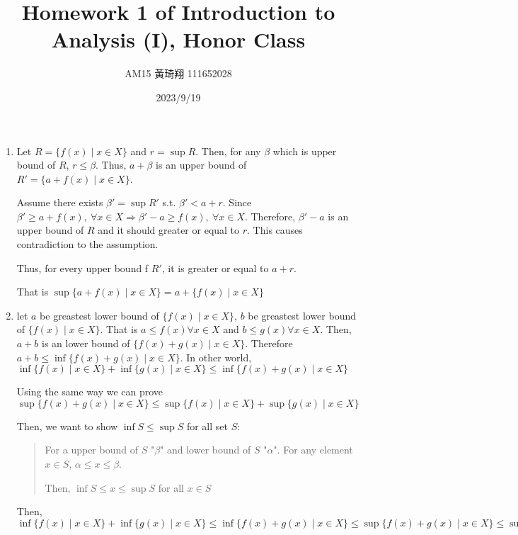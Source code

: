 \documentclass[12pt]{article}
\title{Homework 1 of Introduction to Analysis (I), Honor Class}
\author{AM15 黃琦翔 111652028}
\date{2023/9/19}
\begin{document}
\maketitle
\begin{enumerate}
    \item Let $R = \lbrace f(x) \mid x \in X \rbrace$ and $r = \sup R$. 
    Then, for any $\beta$ which is upper bound of $R$, $r \leq \beta$. 
    Thus, $a + \beta$ is an upper bound of $R' = \lbrace a + f(x) \mid x \in X \rbrace$.

    Assume there exists $\beta' = \sup R'$ s.t. $\beta' < a+r$. 
    Since $\beta' \geq a + f(x),\ \forall x \in X \Rightarrow \beta' - a \geq f(x),\ \forall x \in X$. 
    Therefore, $\beta' - a$ is an upper bound of $R$ and it should greater or equal to $r$. 
    This causes contradiction to the assumption.

    Thus, for every upper bound f $R'$, it is greater or equal to $a + r$.
    
    That is $\sup\lbrace a + f(x) \mid x \in X \rbrace = a + \lbrace f(x) \mid x \in X \rbrace$

    \item let $a$ be greastest lower bound of $\lbrace f(x) \mid x \in X\rbrace$, $b$ be greastest lower bound of $\lbrace f(x) \mid x \in X\rbrace$.
    That is $a \leq f(x) \forall x \in X$ and $b \leq g(x) \forall x \in X$.
    Then, $a + b$ is an lower bound of $\lbrace f(x) + g(x) \mid x \in X \rbrace$. Therefore $a + b \leq \inf \lbrace f(x) + g(x) \mid x \in X\rbrace$.
    In other world, $\inf \lbrace f(x) \mid x \in X\rbrace + \inf \lbrace g(x) \mid x \in X\rbrace \leq \inf \lbrace f(x) + g(x) \mid x \in X\rbrace$

    Using the same way we can prove $\sup \lbrace f(x) + g(x) \mid x \in X \rbrace \leq \sup \lbrace f(x) \mid x \in X \rbrace + \sup \lbrace g(x) \mid x \in X \rbrace$

    Then, we want to show $\inf S \leq \sup S$ for all set $S$:
    \begin{quote}
        For a upper bound of $S$ "$\beta$" and lower bound of $S$ "$\alpha$". For any element $x \in S$, $\alpha \leq x \leq \beta$.

        Then, $\inf S \leq x \leq \sup S$ for all $x\in S$
    \end{quote}

    Then, $\inf \lbrace f(x) \mid x \in X \rbrace + \inf \lbrace g(x) \mid x \in X \rbrace \leq \inf \lbrace f(x) + g(x) \mid x \in X\rbrace \leq \sup \lbrace f(x) + g(x) \mid x \in X \rbrace \leq \sup \lbrace f(x) \mid x \in X \rbrace + \sup \lbrace g(x) \mid x \in X \rbrace$
    

\end{enumerate}
\end{document}
